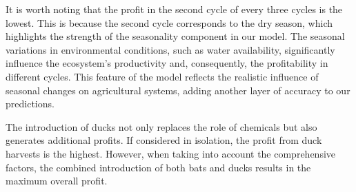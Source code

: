 \documentclass{HZNUMCM}
\begin{document}
        It is worth noting that the profit in the second cycle of every three cycles is the lowest. This is because the second cycle corresponds to the dry season, which highlights the strength of the seasonality component in our model. The seasonal variations in environmental conditions, such as water availability, significantly influence the ecosystem's productivity and, consequently, the profitability in different cycles. This feature of the model reflects the realistic influence of seasonal changes on agricultural systems, adding another layer of accuracy to our predictions.

        The introduction of ducks not only replaces the role of chemicals but also generates additional profits. 
        If considered in isolation, the profit from duck harvests is the highest. 
        However, when taking into account the comprehensive factors, 
        the combined introduction of both bats and ducks results in the maximum overall profit.
\end{document}
